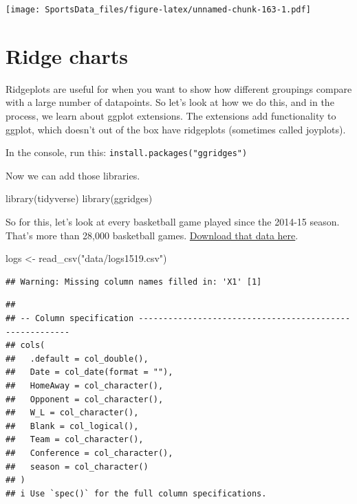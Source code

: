 \documentclass[
]{book}
\newenvironment{Shaded}{\begin{snugshade}}{\end{snugshade}}
\newcommand{\FunctionTok}[1]{\textcolor[rgb]{0.00,0.00,0.00}{#1}}
\newcommand{\NormalTok}[1]{#1}
\newcommand{\OtherTok}[1]{\textcolor[rgb]{0.56,0.35,0.01}{#1}}
\newcommand{\StringTok}[1]{\textcolor[rgb]{0.31,0.60,0.02}{#1}}
\begin{document}
\texttt{[image: SportsData\_files/figure-latex/unnamed-chunk-163-1.pdf]}

\hypertarget{ridge-charts}{%
\chapter{Ridge charts}\label{ridge-charts}}

Ridgeplots are useful for when you want to show how different groupings compare with a large number of datapoints. So let's look at how we do this, and in the process, we learn about ggplot extensions. The extensions add functionality to ggplot, which doesn't out of the box have ridgeplots (sometimes called joyplots).

In the console, run this: \texttt{install.packages("ggridges")}

Now we can add those libraries.

\begin{Shaded}
\begin{Highlighting}[]
\FunctionTok{library}\NormalTok{(tidyverse)}
\FunctionTok{library}\NormalTok{(ggridges)}
\end{Highlighting}
\end{Shaded}

So for this, let's look at every basketball game played since the 2014-15 season. That's more than 28,000 basketball games. \href{https://unl.box.com/s/u9407jj007fxtnu1vbkybdawaqg6j3fw}{Download that data here}.

\begin{Shaded}
\begin{Highlighting}[]
\NormalTok{logs }\OtherTok{\textless{}{-}} \FunctionTok{read\_csv}\NormalTok{(}\StringTok{"data/logs1519.csv"}\NormalTok{)}
\end{Highlighting}
\end{Shaded}

\begin{verbatim}
## Warning: Missing column names filled in: 'X1' [1]
\end{verbatim}

\begin{verbatim}
## 
## -- Column specification --------------------------------------------------------
## cols(
##   .default = col_double(),
##   Date = col_date(format = ""),
##   HomeAway = col_character(),
##   Opponent = col_character(),
##   W_L = col_character(),
##   Blank = col_logical(),
##   Team = col_character(),
##   Conference = col_character(),
##   season = col_character()
## )
## i Use `spec()` for the full column specifications.
\end{verbatim}
\end{document}
